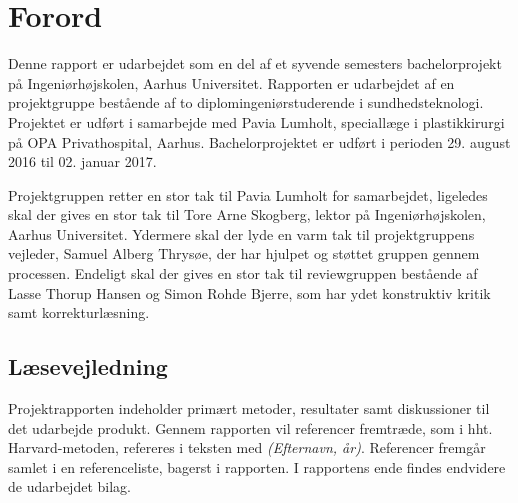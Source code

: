 \chapter*{Forord}

Denne rapport er udarbejdet som en del af et syvende semesters bachelorprojekt på Ingeniørhøjskolen, Aarhus Universitet. Rapporten er udarbejdet af en projektgruppe bestående af to diplomingeniørstuderende i sundhedsteknologi. Projektet er udført i samarbejde med Pavia Lumholt, speciallæge i plastikkirurgi på OPA Privathospital, Aarhus. 
Bachelorprojektet er udført i perioden 29. august 2016 til 02. januar 2017. 

Projektgruppen retter en stor tak til Pavia Lumholt for samarbejdet, ligeledes skal der gives en stor tak til Tore Arne Skogberg, lektor på Ingeniørhøjskolen, Aarhus Universitet. Ydermere skal der lyde en varm tak til projektgruppens vejleder, Samuel Alberg Thrysøe, der har hjulpet og støttet gruppen gennem processen. Endeligt skal der gives en stor tak til reviewgruppen bestående af Lasse Thorup Hansen og Simon Rohde Bjerre, som har ydet konstruktiv kritik samt korrekturlæsning. 

\vspace{2cm}


\begin{centering}
\begin{multicols}{2}

\columnbreak
{}

\end{multicols}
\end{centering}

\vspace{1cm}

\section*{Læsevejledning}
Projektrapporten indeholder primært metoder, resultater samt diskussioner til det udarbejde produkt. 
Gennem rapporten vil referencer fremtræde, som i hht. Harvard-metoden, refereres i teksten med \textit{(Efternavn, år)}. Referencer fremgår samlet i en referenceliste, bagerst i rapporten. I rapportens ende findes endvidere de udarbejdet bilag. 


 